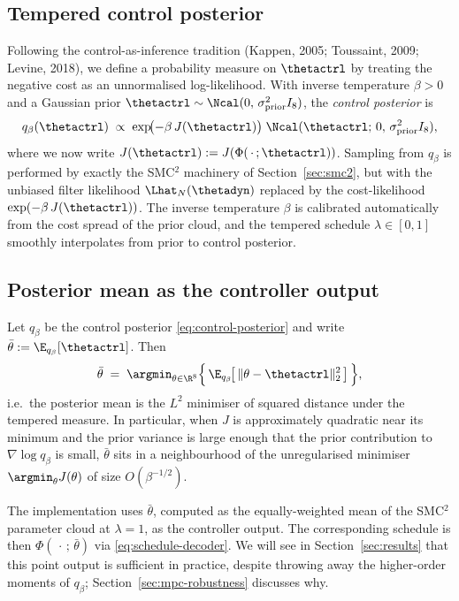 \subsection{Tempered control posterior}

Following the control-as-inference tradition (Kappen, 2005; Toussaint,
2009; Levine, 2018), we define a probability measure on $\thetactrl$ by
treating the negative cost as an unnormalised log-likelihood. With
inverse temperature $\beta>0$ and a Gaussian prior
$\thetactrl \sim \Ncal(0,\,\sigma_{\mathrm{prior}}^2 I_8)$, the
\emph{control posterior} is
\begin{equation}
  q_\beta(\thetactrl) \;\propto\;
    \exp\!\bigl(-\beta\,J(\thetactrl)\bigr)\;
    \Ncal(\thetactrl;\,0,\,\sigma_{\mathrm{prior}}^2 I_8),
  \label{eq:control-posterior}
\end{equation}
where we now write $J(\thetactrl) := J(\Phi(\,\cdot\,;\thetactrl))$.
Sampling from $q_\beta$ is performed by exactly the SMC${}^2$ machinery
of Section~\ref{sec:smc2}, but with the unbiased filter likelihood
$\Lhat_N(\thetadyn)$ replaced by the cost-likelihood
$\exp(-\beta\,J(\thetactrl))$. The inverse temperature $\beta$ is
calibrated automatically from the cost spread of the prior cloud, and the
tempered schedule $\lambda \in [0,1]$ smoothly interpolates from prior to
control posterior.

\subsection{Posterior mean as the controller output}

\begin{proposition}\label{prop:control-mean}
Let $q_\beta$ be the control posterior \eqref{eq:control-posterior} and
write $\bar\theta := \E_{q_\beta}[\thetactrl]$. Then
\begin{equation}
  \bar\theta \;=\; \argmin_{\theta \in \R^8}
    \Bigl\{\,\E_{q_\beta}\!\bigl[\,\|\theta - \thetactrl\|_2^2\,\bigr]\,\Bigr\},
  \label{eq:posterior-mean-l2}
\end{equation}
i.e.\ the posterior mean is the $L^2$ minimiser of squared distance under
the tempered measure. In particular, when $J$ is approximately
quadratic near its minimum and the prior variance is large enough that
the prior contribution to $\nabla \log q_\beta$ is small, $\bar\theta$
sits in a neighbourhood of the unregularised minimiser
$\argmin_\theta J(\theta)$ of size $O(\beta^{-1/2})$.
\end{proposition}

The implementation uses $\bar\theta$, computed as the equally-weighted
mean of the SMC${}^2$ parameter cloud at $\lambda=1$, as the controller
output. The corresponding schedule is then
$\Phi(\,\cdot\,;\,\bar\theta)$ via \eqref{eq:schedule-decoder}. We will
see in Section~\ref{sec:results} that this point output is sufficient in
practice, despite throwing away the higher-order moments of $q_\beta$;
Section~\ref{sec:mpc-robustness} discusses why.
